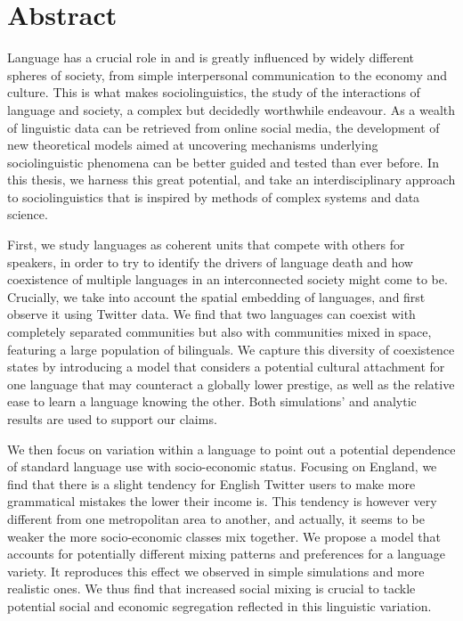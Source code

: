 \documentclass[../thesis.tex]{subfiles}
\begin{document}
\begingroup
\let\cleardoublepage\relax
\let\cleardoublepage\relax

\chapter*{Abstract}
Language has a crucial role in and is greatly influenced by widely different spheres of
society, from simple interpersonal communication to the economy and culture. This is
what makes sociolinguistics, the study of the interactions of language and society, a
complex but decidedly worthwhile endeavour. As a wealth of linguistic data can be
retrieved from online social media, the development of new theoretical models aimed at
uncovering mechanisms underlying sociolinguistic phenomena can be better guided and
tested than ever before. In this thesis, we harness this great potential, and take an
interdisciplinary approach to sociolinguistics that is inspired by methods of complex
systems and data science.

First, we study languages as coherent units that compete with others for speakers, in
order to try to identify the drivers of language death and how coexistence of multiple
languages in an interconnected society might come to be. Crucially, we take into account
the spatial embedding of languages, and first observe it using Twitter data. We find
that two languages can coexist with completely separated communities but also with
communities mixed in space, featuring a large population of bilinguals. We capture this
diversity of coexistence states by introducing a model that considers a potential
cultural attachment for one language that may counteract a globally lower prestige, as
well as the relative ease to learn a language knowing the other. Both simulations' and
analytic results are used to support our claims.

We then focus on variation within a language to point out a potential dependence of
standard language use with socio-economic status. Focusing on England, we find that
there is a slight tendency for English Twitter users to make more grammatical mistakes
the lower their income is. This tendency is however very different from one metropolitan
area to another, and actually, it seems to be weaker the more socio-economic classes mix
together. We propose a model that accounts for potentially different mixing patterns and
preferences for a language variety. It reproduces this effect we observed in simple
simulations and more realistic ones.
We thus find that increased social mixing is crucial to tackle potential social and
economic segregation reflected in this linguistic variation.
\end{document}
